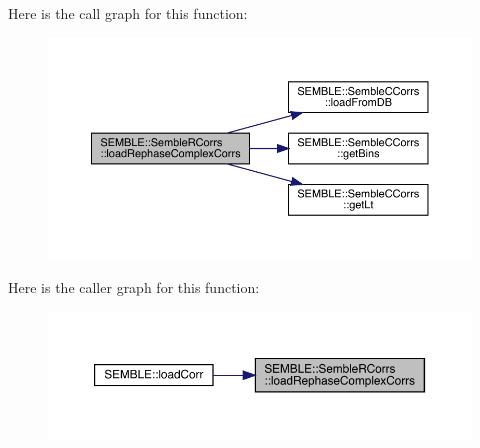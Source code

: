 Here is the call graph for this function\+:
\nopagebreak
\begin{figure}[H]
\begin{center}
\leavevmode
\includegraphics[width=350pt]{d4/d78/classSEMBLE_1_1SembleRCorrs_aae586006dab4a9da40e75f2ac09c30bc_cgraph}
\end{center}
\end{figure}
Here is the caller graph for this function\+:
\nopagebreak
\begin{figure}[H]
\begin{center}
\leavevmode
\includegraphics[width=350pt]{d4/d78/classSEMBLE_1_1SembleRCorrs_aae586006dab4a9da40e75f2ac09c30bc_icgraph}
\end{center}
\end{figure}
\mbox{\label{classSEMBLE_1_1SembleRCorrs_a90df6abc8a20c39a8f0d5c04ad8efc97}} 
